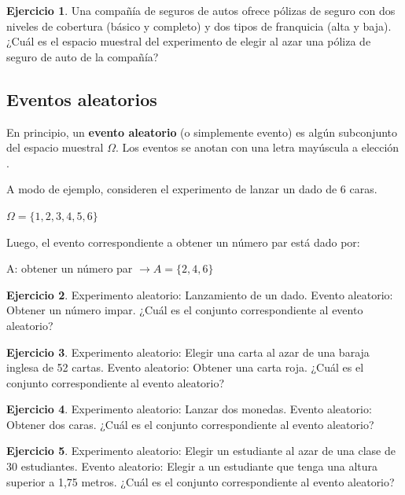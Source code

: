 \documentclass[
  11pt,
]{book}
\theoremstyle{definition}
\theoremstyle{definition}
\theoremstyle{definition}
\newtheorem{exercise}{Ejercicio}[chapter]
\theoremstyle{definition}
\theoremstyle{remark}
\begin{document}
\begin{exercise}
Una compañía de seguros de autos ofrece pólizas de seguro con dos niveles de cobertura (básico y completo) y dos tipos de franquicia (alta y baja). ¿Cuál es el espacio muestral del experimento de elegir al azar una póliza de seguro de auto de la compañía?
\end{exercise}

\subsection{Eventos aleatorios}\label{eventos-aleatorios}

En principio, un \textbf{evento aleatorio} (o simplemente evento) es algún subconjunto del espacio muestral \(\Omega\). Los eventos se anotan con una letra mayúscula a elección \citep[página 153]{anderson}.

A modo de ejemplo, consideren el experimento de lanzar un dado de 6 caras.

\(\Omega = \lbrace 1,2,3,4,5,6 \rbrace\)

Luego, el evento correspondiente a obtener un número par está dado por:

A: obtener un número par \(\rightarrow A = \lbrace 2,4,6 \rbrace\)

\begin{exercise}
Experimento aleatorio: Lanzamiento de un dado. Evento aleatorio: Obtener un número impar. ¿Cuál es el conjunto correspondiente al evento aleatorio?
\end{exercise}

\begin{exercise}
Experimento aleatorio: Elegir una carta al azar de una baraja inglesa de 52 cartas. Evento aleatorio: Obtener una carta roja. ¿Cuál es el conjunto correspondiente al evento aleatorio?
\end{exercise}

\begin{exercise}
Experimento aleatorio: Lanzar dos monedas. Evento aleatorio: Obtener dos caras. ¿Cuál es el conjunto correspondiente al evento aleatorio?
\end{exercise}

\begin{exercise}
Experimento aleatorio: Elegir un estudiante al azar de una clase de 30 estudiantes. Evento aleatorio: Elegir a un estudiante que tenga una altura superior a 1,75 metros. ¿Cuál es el conjunto correspondiente al evento aleatorio?
\end{exercise}
\end{document}
